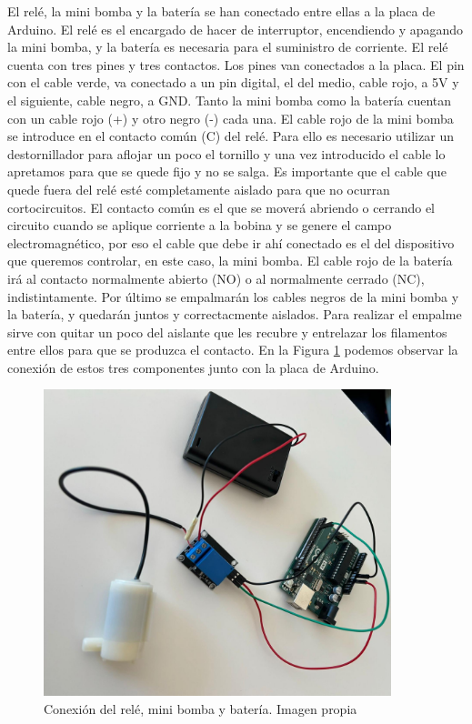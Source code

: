 El relé, la mini bomba y la batería se han conectado entre ellas a la placa de Arduino. El relé es el encargado de hacer de interruptor, encendiendo y apagando la mini bomba, y la batería es necesaria para el suministro de corriente. El relé cuenta con tres pines y tres contactos. Los pines van conectados a la placa. El pin con el cable verde, va conectado a un pin digital, el del medio, cable rojo, a 5V y el siguiente, cable negro, a GND. Tanto la mini bomba como la batería cuentan con un cable rojo (+) y otro negro (-) cada una. El cable rojo de la mini bomba se introduce en el contacto común (C) del relé. Para ello es necesario utilizar un destornillador para aflojar un poco el tornillo y una vez introducido el cable lo apretamos para que se quede fijo y no se salga. Es importante que el cable que quede fuera del relé esté completamente aislado para que no ocurran cortocircuitos. El contacto común es el que se moverá abriendo o cerrando el circuito cuando se aplique corriente a la bobina y se genere el campo electromagnético, por eso el cable que debe ir ahí conectado es el del dispositivo que queremos controlar, en este caso, la mini bomba. El cable rojo de la batería irá al contacto normalmente abierto (NO) o al normalmente cerrado (NC), indistintamente. Por último se empalmarán los cables negros de la mini bomba y la batería, y quedarán juntos y correctacmente aislados. Para realizar el empalme sirve con quitar un poco del aislante que les recubre y entrelazar los filamentos entre ellos para que se produzca el contacto. En la Figura \ref{fig:conex_rele} podemos observar la conexión de estos tres componentes junto con la placa de Arduino.
\begin{figure}[h]
    \centering
    \includegraphics[width=0.9\textwidth]{img/rele-bomba.jpg}
    \caption{Conexión del relé, mini bomba y batería. Imagen propia}
    \label{fig:conex_rele}
\end{figure}

